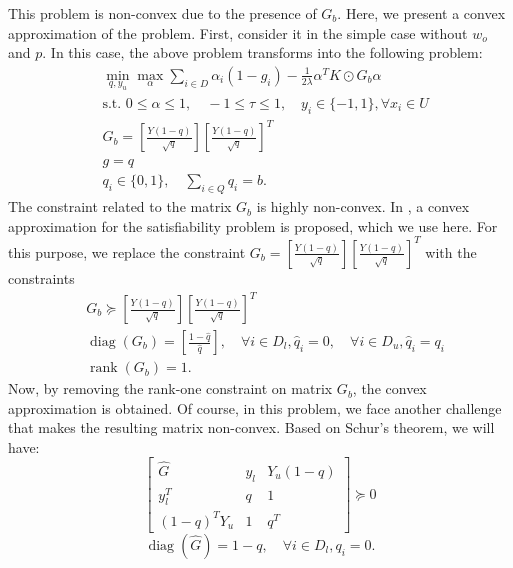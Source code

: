 \documentclass[12pt]{article}
\DeclareMathOperator{\diag}{diag}
\DeclareMathOperator{\rank}{rank}
\begin{document}
	This problem is non-convex due to the presence of $G_b$. Here, we present a convex approximation of the problem. First, consider it in the simple case without $w_o$ and $p$. In this case, the above problem transforms into the following problem:
	\begin{subequations}
		\label{eq:ral-simple}
		\begin{align}
			&\min_{q, y_u} \max_{\alpha} \sum_{i \in D} \alpha_i (1 - g_i) - \frac{1}{2\lambda} \alpha^T K \odot G_b \alpha \\
			&\text{s.t. } 0 \le \alpha \le 1, \quad -1 \le \tau \le 1, \quad y_i \in \{-1, 1\}, \forall x_i \in U \\
			&G_b = \left[\frac{Y(1-q)}{\sqrt{q}}\right] \left[\frac{Y(1-q)}{\sqrt{q}}\right]^T \\
			&g = q \\
			&q_i \in \{0, 1\}, \quad \sum_{i \in Q} q_i = b.
		\end{align}
	\end{subequations}
	The constraint related to the matrix $G_b$ is highly non-convex. In \cite{karimi2016statistical}, a convex approximation for the satisfiability problem is proposed, which we use here. For this purpose, we replace the constraint $G_b = \left[\frac{Y(1-q)}{\sqrt{q}}\right] \left[\frac{Y(1-q)}{\sqrt{q}}\right]^T$ with the constraints
	\begin{subequations}
		\begin{align}
			&G_b \succeq \left[\frac{Y(1-q)}{\sqrt{q}}\right] \left[\frac{Y(1-q)}{\sqrt{q}}\right]^T \\
			&\diag(G_b) = \left[\frac{1-\hat{q}}{\hat{q}}\right], \quad \forall i \in D_l, \hat{q}_i = 0, \quad \forall i \in D_u, \hat{q}_i = q_i \\
			&\rank(G_b) = 1.
		\end{align}
	\end{subequations}
	Now, by removing the rank-one constraint on matrix $G_b$, the convex approximation is obtained. Of course, in this problem, we face another challenge that makes the resulting matrix non-convex. Based on Schur's theorem, we will have:
	\begin{equation}
		\begin{bmatrix}
			\hat{G} & y_l & Y_u(1-q) \\
			y_l^T & q & 1 \\
			(1-q)^T Y_u & 1 & q^T
		\end{bmatrix} \succeq 0
	\end{equation}
	\begin{equation}
		\diag(\hat{G}) = 1 - q, \quad \forall i \in D_l, q_i = 0.
	\end{equation}
\end{document}
